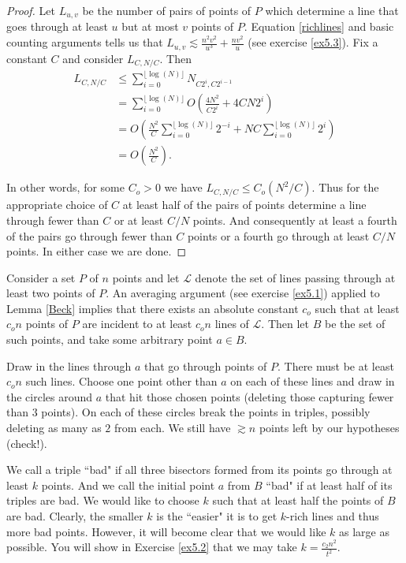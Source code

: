 \documentclass[]{amsart}
\numberwithin{equation}{section}
\theoremstyle{plain}
\theoremstyle{definition}
\theoremstyle{remark}
\begin{document}
\begin{proof}
Let $L_{u,v}$ be the number of pairs of points of $P$ which
determine a line that goes through at least $u$ but at most $v$
points of $P$.  Equation \ref{richlines} and basic counting
arguments tells us that $L_{u,v} \lesssim \frac{n^2v^2}{u^3} +
\frac{nv^2}{u}$ (see exercise \ref{ex5.3}).  Fix a constant $C$
and consider $L_{C, N/C}$.  Then
\begin{equation}
\begin{split}
L_{C, N/C} &\leq \sum_{i=0}^{\lfloor \log(N) \rfloor} N_{C2^i, C2^{i-1}} \\
&= \sum_{i=0}^{\lfloor \log(N) \rfloor} O\left( \frac{4N^2}{C2^i} + 4CN2^i \right)  \\
&=  O \left( \frac{N^2}{C} \sum_{i=0}^{\lfloor \log(N) \rfloor} 2^{-i} + NC \sum_{i=0}^{\lfloor \log(N) \rfloor} 2^i \right) \\
&= O\left( \frac{N^2}{C} \right).
\end{split}
\end{equation}


In other words, for some $C_o > 0$ we have $L_{C, N/C} \leq C_o
\left( N^2/C \right)$.  Thus for the appropriate choice of $C$ at
least half of the pairs of points determine a line through fewer
than $C$ or at least $C/N$ points.  And consequently at least a
fourth of the pairs go through fewer than $C$ points or a fourth
go through at least $C/N$ points.  In either case we are done.

\end{proof}


Consider a set $P$ of $n$ points and let  $\mathcal{L}$ denote the
set of lines passing through at least two points of $P$.  An
averaging argument (see exercise \ref{ex5.1}) applied to Lemma
\ref{Beck} implies that there exists an absolute constant $c_o$
such that at least $c_on$ points of $P$ are incident to at least
$c_on$ lines of $\mathcal{L}$.  Then let $B$ be the set of such
points, and take some arbitrary point $a \in B$.

Draw in the lines through $a$ that go through points of $P$. There
must be at least $c_on$ such lines.  Choose one point other than
$a$ on each of these lines and draw in the circles around $a$ that
hit those chosen points (deleting those capturing fewer than $3$
points).  On each of these circles break the points in triples,
possibly deleting as many as $2$ from each.  We still have
$\gtrsim n$ points left by our hypotheses (check!).

We call a triple ``bad" if all three bisectors formed from its
points go through at least $k$ points.  And we call the initial
point $a$ from $B$ ``bad" if at least half of its triples are bad.
We would like to choose $k$ such that at least half the points of
$B$ are bad.  Clearly, the smaller $k$ is the ``easier" it is to
get $k$-rich lines and thus more bad points.  However, it will
become clear that we would like $k$ as large as possible.  You
will show in Exercise \ref{ex5.2} that we may take $k=
\frac{c_2n^2}{t^2}$.
\end{document}

